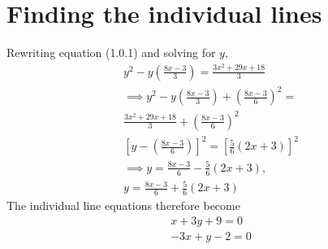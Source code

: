 \documentclass[journal,12pt,twocolumn]{IEEEtran}
\begin{document}
\section{Finding the individual lines}
Rewriting equation (1.0.1) and solving for $y$,
\begin{align}
y^2-y\left(\frac{8x-3}{3}\right)=\frac{3x^2+29x+18}{3}\\
\implies y^2-y\left(\frac{8x-3}{3}\right)+\left(\frac{8x-3}{6}\right)^2=\\\frac{3x^2+29x+18}{3}+\left(\frac{8x-3}{6}\right)^2\\
\left[y-\left(\frac{8x-3}{6}\right)\right]^2=\left[\frac{5}{6}(2x+3)\right]^2\\
\implies y=\frac{8x-3}{6}-\frac{5}{6}(2x+3),\\
y=\frac{8x-3}{6}+\frac{5}{6}(2x+3)
\end{align}
The individual line equations therefore become
\begin{align}
    x+3y+9=0\\-3x+y-2=0
\end{align}
\end{document}
